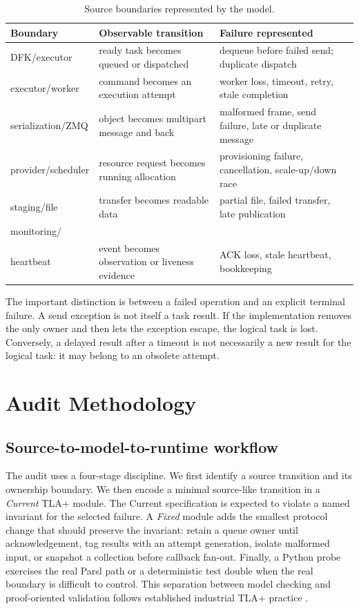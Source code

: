 \documentclass[11pt,a4paper]{article}
\newenvironment{tabularx}[2]{\begin{tabular}{#2}}{\end{tabular}}
\begin{document}
\begin{table}[h]
\centering
\caption{Source boundaries represented by the model.}
\label{tab:boundaries}
\normalsize
\begin{tabularx}{\textwidth}{>{\raggedright\arraybackslash}p{0.22\textwidth} X X}
\toprule
Boundary & Observable transition & Failure represented \\
\midrule
DFK/executor & ready task becomes queued or dispatched & dequeue before failed send; duplicate dispatch \\
executor/worker & command becomes an execution attempt & worker loss, timeout, retry, stale completion \\
serialization/ZMQ & object becomes multipart message and back & malformed frame, send failure, late or duplicate message \\
provider/scheduler & resource request becomes running allocation & provisioning failure, cancellation, scale-up/down race \\
staging/file & transfer becomes readable data & partial file, failed transfer, late publication \\
monitoring/\\heartbeat & event becomes observation or liveness evidence & ACK loss, stale heartbeat, bookkeeping \\
\bottomrule
\end{tabularx}
\end{table}

The important distinction is between a failed operation and an explicit terminal failure. A send
exception is not itself a task result. If the implementation removes the only owner and then lets
the exception escape, the logical task is lost. Conversely, a delayed result after a timeout is not
necessarily a new result for the logical task: it may belong to an obsolete attempt.

\section{Audit Methodology}
\subsection{Source-to-model-to-runtime workflow}
The audit uses a four-stage discipline. We first identify a source transition and its ownership
boundary. We then encode a minimal source-like transition in a \emph{Current} TLA+ module. The
Current specification is expected to violate a named invariant for the selected failure. A
\emph{Fixed} module adds the smallest protocol change that should preserve the invariant: retain a
queue owner until acknowledgement, tag results with an attempt generation, isolate malformed input,
or snapshot a collection before callback fan-out. Finally, a Python probe exercises the real Parsl
path or a deterministic test double when the real boundary is difficult to control. This separation
between model checking and proof-oriented validation follows established industrial TLA+ practice
\cite{newcombe2015formal,cousineau2012tlaps,chaudhuri2010tlaps}.
\end{document}
